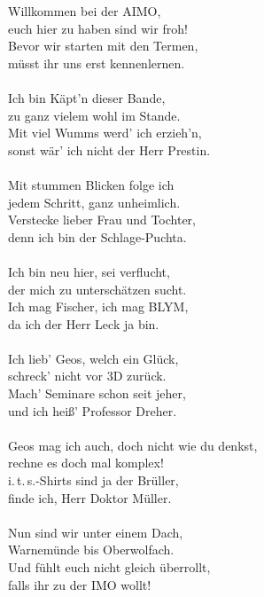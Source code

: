 \documentclass[oneside]{memoir}
\begin{document}
\newpage
\thispagestyle{plain}
\begin{singlespace}
Willkommen bei der AIMO, \\
euch hier zu haben sind wir froh! \\
Bevor wir starten mit den Termen, \\
müsst ihr uns erst kennenlernen. \\  \\

Ich bin Käpt'n dieser Bande, \\
zu ganz vielem wohl im Stande. \\
Mit viel Wumms werd' ich erzieh'n, \\
sonst wär' ich nicht der Herr Prestin. \\ \\

Mit stummen Blicken folge ich \\
jedem Schritt, ganz unheimlich. \\
Verstecke lieber Frau und Tochter, \\
denn ich bin der Schlage-Puchta. \\ \\

Ich bin neu hier, sei verflucht, \\
der mich zu unterschätzen sucht. \\
Ich mag Fischer, ich mag BLYM, \\
da ich der Herr Leck ja bin. \\ \\

Ich lieb' Geos, welch ein Glück, \\
schreck' nicht vor 3D zurück. \\
Mach' Seminare schon seit jeher, \\
und ich heiß' Professor Dreher. \\ \\

Geos mag ich auch, doch nicht wie du denkst, \\
rechne es doch mal komplex! \\
i.\,t.\,s.-Shirts sind ja der Brüller, \\
finde ich, Herr Doktor Müller. \\ \\

Nun sind wir unter einem Dach, \\
Warnemünde bis Oberwolfach. \\
Und fühlt euch nicht gleich überrollt, \\
falls ihr zu der IMO wollt!
\end{singlespace}
\end{document}
